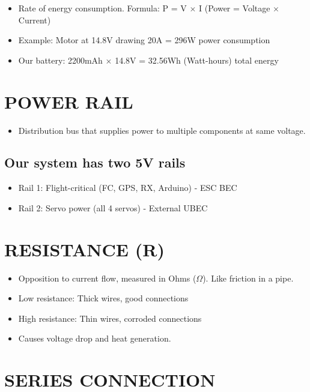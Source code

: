 \documentclass[11pt,letterpaper]{article}
\begin{document}
\begin{itemize}
  \item Rate of energy consumption. Formula: P = V $\times$ I (Power = Voltage $\times$ Current)
  \item Example: Motor at 14.8V drawing 20A = 296W power consumption
  \item Our battery: 2200mAh $\times$ 14.8V = 32.56Wh (Watt-hours) total energy
\end{itemize}

\section{POWER RAIL}

\begin{itemize}
  \item Distribution bus that supplies power to multiple components at same voltage.
\end{itemize}

\subsection{Our system has two 5V rails}

\begin{itemize}
  \item Rail 1: Flight-critical (FC, GPS, RX, Arduino) - ESC BEC
  \item Rail 2: Servo power (all 4 servos) - External UBEC
\end{itemize}

\section{RESISTANCE (R)}

\begin{itemize}
  \item Opposition to current flow, measured in Ohms ($\Omega$). Like friction in a pipe.
  \item Low resistance: Thick wires, good connections
  \item High resistance: Thin wires, corroded connections
  \item Causes voltage drop and heat generation.
\end{itemize}

\section{SERIES CONNECTION}
\end{document}
